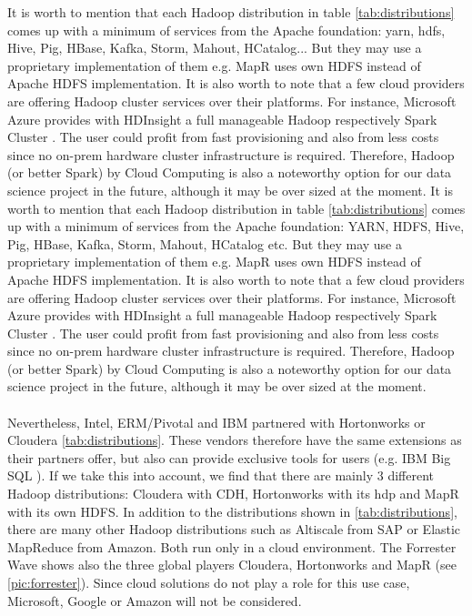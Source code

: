 \noindent It is worth to mention that each Hadoop distribution in table \ref{tab:distributions} comes up with a minimum of services from the Apache foundation: \ac{yarn}, \ac{hdfs}, Hive, Pig, HBase, Kafka, Storm, Mahout, HCatalog... But they may use a proprietary implementation of them e.g. MapR uses own HDFS instead of Apache HDFS implementation. It is also worth to note that a few cloud providers are offering Hadoop cluster services over their platforms. For instance, Microsoft Azure provides with HDInsight a full manageable Hadoop respectively Spark Cluster \citep{Microsoft2018}. The user could profit from fast provisioning and also from less costs since no on-prem hardware cluster infrastructure is required. Therefore, Hadoop (or better Spark) by Cloud Computing is also a noteworthy option for our data science project in the future, although it may be over sized at the moment. It is worth to mention that each Hadoop distribution in table \ref{tab:distributions} comes up with a minimum of services from the Apache foundation: YARN, HDFS, Hive, Pig, HBase, Kafka, Storm, Mahout, HCatalog etc. But they may use
a proprietary implementation of them e.g. MapR uses own HDFS instead of Apache HDFS implementation. 
It is also worth to note that a few cloud providers are offering Hadoop cluster services over their platforms. 
For instance, Microsoft Azure provides with HDInsight a full manageable Hadoop respectively Spark Cluster
\citep{Microsoft2018}. The user could profit from fast provisioning and also from less costs since no on-prem hardware
cluster infrastructure is required. Therefore, Hadoop (or better Spark) by Cloud Computing is also a
noteworthy option for our data science project in the future, although it may be over sized at the moment.\\\\
Nevertheless, Intel, ERM/Pivotal and IBM partnered with Hortonworks or Cloudera \ref{tab:distributions}. These vendors therefore have the same extensions as their partners offer, but also can provide exclusive tools for users (e.g. IBM Big SQL \citep{MervAdrian2017}). If we take this into account, we find that there are mainly 3 different Hadoop distributions: Cloudera with CDH, Hortonworks with its \ac{hdp} and MapR with its own HDFS. In addition to the distributions shown in \ref{tab:distributions}, there are many other Hadoop distributions such as Altiscale from SAP or Elastic MapReduce from Amazon. Both run only in a cloud environment. The Forrester Wave shows also the three global players Cloudera, Hortonworks and MapR (see \ref{pic:forrester}). Since cloud solutions do not play a role for this use case, Microsoft, Google or Amazon will not be considered.
